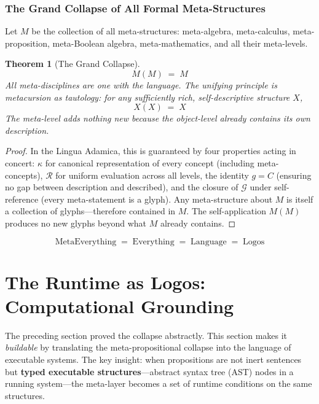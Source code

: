 \documentclass[12pt, letterpaper]{book}
\def\equiv{=}%
\def\mathfrak#1{#1}%
\newtheorem{theorem}{Theorem}[chapter]
\begin{document}
\subsubsection{The Grand Collapse of All Formal Meta-Structures}

Let $\mathfrak{M}$ be the collection of all meta-structures: meta-algebra, meta-calculus, meta-proposition, meta-Boolean algebra, meta-mathematics, and all their meta-levels.

\begin{theorem}[The Grand Collapse]\label{thm:grand-collapse}
\[
\mathfrak{M}(\mathfrak{M}) \;\equiv\; \mathfrak{M}
\]
All meta-disciplines are one with the language. The unifying principle is metacursion as tautology: for any sufficiently rich, self-descriptive structure $X$,
\[
X(X) \;\equiv\; X
\]
The meta-level adds nothing new because the object-level already contains its own description.
\end{theorem}

\begin{proof}
In the Lingua Adamica, this is guaranteed by four properties acting in concert: $\kappa$ for canonical representation of every concept (including meta-concepts), $\mathcal{R}$ for uniform evaluation across all levels, the identity $\mathfrak{g} \equiv C$ (ensuring no gap between description and described), and the closure of $\mathcal{G}$ under self-reference (every meta-statement is a glyph). Any meta-structure about $\mathfrak{M}$ is itself a collection of glyphs---therefore contained in $\mathfrak{M}$. The self-application $\mathfrak{M}(\mathfrak{M})$ produces no new glyphs beyond what $\mathfrak{M}$ already contains.
\end{proof}

\[
\boxed{\mathrm{MetaEverything} \;\equiv\; \mathrm{Everything} \;\equiv\; \mathrm{Language} \;\equiv\; \mathrm{Logos}}
\]


\section{The Runtime as Logos: Computational Grounding}

The preceding section proved the collapse abstractly. This section makes it \textit{buildable} by translating the meta-propositional collapse into the language of executable systems. The key insight: when propositions are not inert sentences but \textbf{typed executable structures}---abstract syntax tree (AST) nodes in a running system---the meta-layer becomes a set of runtime conditions on the same structures.
\end{document}
